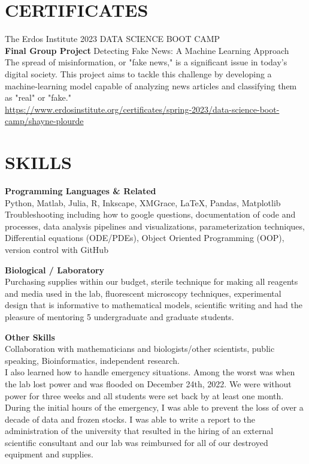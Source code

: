 \documentclass[10pt]{res} %
\begin{document}
\begin{resume}
\section{CERTIFICATES}
    The Erdos Institute 2023 DATA SCIENCE BOOT CAMP\\
    {\bf Final Group Project} Detecting Fake News: A Machine Learning Approach\\
    The spread of misinformation, or "fake news," is a significant issue in today's digital society. This project aims to tackle this challenge by developing a machine-learning model capable of analyzing news articles and classifying them as "real" or "fake."\\
    \url{https://www.erdosinstitute.org/certificates/spring-2023/data-science-boot-camp/shayne-plourde}
            
\section{SKILLS}
{\bf Programming Languages \& Related}\\
    Python, Matlab, Julia, R, Inkscape, XMGrace, LaTeX, Pandas, Matplotlib\\
    Troubleshooting including how to google questions, documentation of code and processes, data analysis pipelines and visualizations, parameterization techniques, Differential equations (ODE/PDEs), Object Oriented Programming (OOP), version control with GitHub

{\bf Biological / Laboratory}\\
    Purchasing supplies within our budget, sterile technique for making all reagents and media used in the lab, fluorescent microscopy techniques, experimental design that is informative to mathematical models, scientific writing and had the pleasure of mentoring 5 undergraduate and graduate students.

{\bf Other Skills}\\
    Collaboration with mathematicians and biologists/other scientists, public speaking, Bioinformatics, independent research.\\    
    I also learned how to handle emergency situations. Among the worst was when the lab lost power and was flooded on December 24th, 2022. We were without power for three weeks and all students were set back by at least one month. During the initial hours of the emergency, I was able to prevent the loss of over a decade of data and frozen stocks. I was able to write a report to the administration of the university that resulted in the hiring of an external scientific consultant and our lab was reimbursed for all of our destroyed equipment and supplies. 
 

\end{resume}
\end{document}
